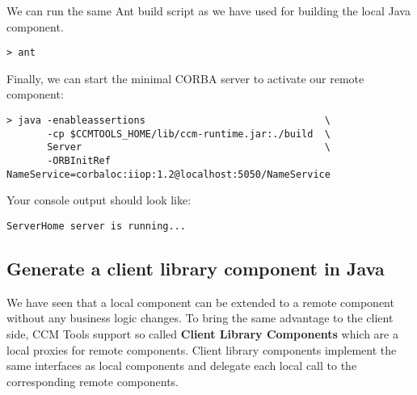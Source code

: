 We can run the same Ant build script as we have used for building the
local Java component. 
\begin{footnotesize}
\begin{verbatim}
> ant
\end{verbatim}
\end{footnotesize}

Finally, we can start the minimal CORBA server to activate our remote component:
\begin{footnotesize}
\begin{verbatim}
> java -enableassertions                               \
       -cp $CCMTOOLS_HOME/lib/ccm-runtime.jar:./build  \
       Server                                          \
       -ORBInitRef NameService=corbaloc:iiop:1.2@localhost:5050/NameService
\end{verbatim}
\end{footnotesize}

Your console output should look like:
\begin{footnotesize}
\begin{verbatim}
ServerHome server is running...
\end{verbatim}
\end{footnotesize}


\subsection{Generate a client library component in Java}
\label{subsection:GenerateClientLibComponentInJava}

We have seen that a local component can be extended to a remote component
without any business logic changes.
To bring the same advantage to the client side, CCM Tools support so called
{\bf Client Library Components} which are a local proxies for remote components.
Client library components implement the same interfaces as local components and
delegate each local call to the corresponding remote components.
 
